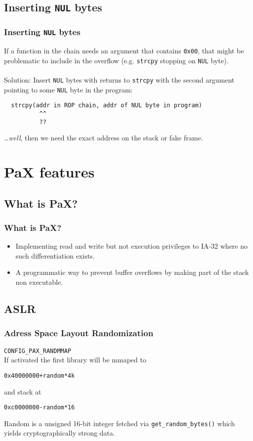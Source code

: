 \documentclass[10pt]{beamer}
\begin{document}
\subsection{Inserting \texttt{NUL} bytes}

\begin{frame}[fragile]
  \frametitle{Inserting \texttt{NUL} bytes}

  If a function in the chain needs an argument that contains \texttt{0x00},
  that might be problematic to include in the overflow (e.g. \texttt{strcpy}
  stopping on \texttt{NUL} byte).
  \hfill\\
  \hfill\\

  Solution: Insert \texttt{NUL} bytes with returns to \texttt{strcpy} with the
  second argument pointing to some \texttt{NUL} byte in the program:

  \begin{verbatim}
  strcpy(addr in ROP chain, addr of NUL byte in program)
          ^^
          ??
  \end{verbatim}

  \emph{\dots well}, then we need the exact address on the stack or fake frame.
\end{frame}


\section{PaX features}  %
\subsection{What is PaX?}
\begin{frame}
\frametitle{What is PaX?}
\begin{itemize}
\item Implementing read and write but not execution privileges to IA-32 where no
such differentiation exists.
\item A programmatic way to prevent buffer overflows by making part of the stack
non executable.
\end{itemize}
\end{frame}

\subsection{ASLR}
\begin{frame}
\frametitle{Adress Space Layout Randomization}
\hspace{25mm}\texttt{CONFIG\_PAX\_RANDMMAP}
\\
If activated the first library will be mmaped to

\hspace{10mm}\texttt{0x40000000+random*4k}

and stack at

\hspace{10mm}\texttt{0xc0000000-random*16}

Random is a unsigned 16-bit integer fetched via \texttt{get\_random\_bytes()} which
yields cryptographically strong data.

\end{frame}
\end{document}
